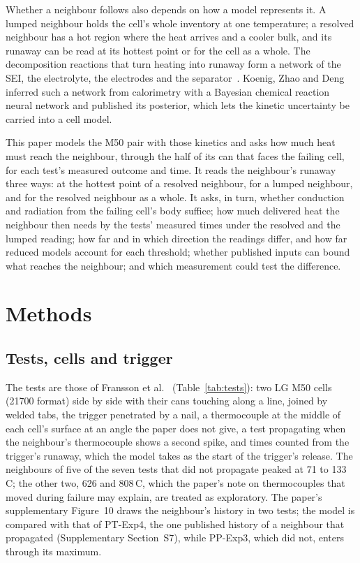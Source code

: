 \documentclass[preprint,12pt]{elsarticle}
\newcommand{\degC}{\,\textdegree C}
\begin{document}
Whether a neighbour follows also depends on how a model represents it. A lumped neighbour holds the cell's whole inventory at one temperature; a resolved neighbour has a hot region where the heat arrives and a cooler bulk, and its runaway can be read at its hottest point or for the cell as a whole. The decomposition reactions that turn heating into runaway form a network of the SEI, the electrolyte, the electrodes and the separator~\cite{feng2018mechanism}. Koenig, Zhao and Deng~\cite{koenig2025uncertainty} inferred such a network from calorimetry with a Bayesian chemical reaction neural network and published its posterior, which lets the kinetic uncertainty be carried into a cell model.

This paper models the M50 pair with those kinetics and asks how much heat must reach the neighbour, through the half of its can that faces the failing cell, for each test's measured outcome and time. It reads the neighbour's runaway three ways: at the hottest point of a resolved neighbour, for a lumped neighbour, and for the resolved neighbour as a whole. It asks, in turn, whether conduction and radiation from the failing cell's body suffice; how much delivered heat the neighbour then needs by the tests' measured times under the resolved and the lumped reading; how far and in which direction the readings differ, and how far reduced models account for each threshold; whether published inputs can bound what reaches the neighbour; and which measurement could test the difference.

\section{Methods}
\label{sec:methods}

\subsection{Tests, cells and trigger}
\label{sec:tests}

The tests are those of Fransson et al.~\cite{fransson2024exploring} (Table~\ref{tab:tests}): two LG M50 cells (21700 format) side by side with their cans touching along a line, joined by welded tabs, the trigger penetrated by a nail, a thermocouple at the middle of each cell's surface at an angle the paper does not give, a test propagating when the neighbour's thermocouple shows a second spike, and times counted from the trigger's runaway, which the model takes as the start of the trigger's release. The neighbours of five of the seven tests that did not propagate peaked at 71 to 133\degC; the other two, 626 and 808\degC, which the paper's note on thermocouples that moved during failure may explain, are treated as exploratory. The paper's supplementary Figure~10 draws the neighbour's history in two tests; the model is compared with that of PT-Exp4, the one published history of a neighbour that propagated (Supplementary Section~S7), while PP-Exp3, which did not, enters through its maximum.
\end{document}
